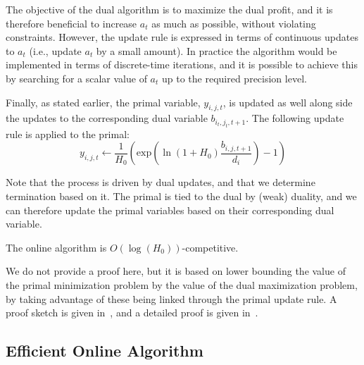 The objective of the dual algorithm is to maximize the dual profit, and it is therefore beneficial to increase $a_t$ as much as possible, without violating constraints.
However, the update rule is expressed in terms of continuous updates to $a_t$ (i.e., update $a_t$ by a small amount).
In practice the algorithm would be implemented in terms of discrete-time iterations, and it is possible to achieve this by searching for a scalar value of $a_t$ up to the required precision level.

Finally, as stated earlier, the primal variable, $y_{i,j,t}$, is updated as well along side the updates to the corresponding dual variable $b_{i_t,j_t,t+1}$.
The following update rule is applied to the primal:
\[
 y_{i,j,t} \leftarrow \frac{1}{H_0}\left(\textrm{exp}\left(\ln(1+H_0) \frac{b_{i,j,t+1}}{d_i}\right)-1\right)
\]

Note that the process is driven by dual updates, and that we determine termination based on it.
The primal is tied to the dual by (weak) duality, and we can therefore update the primal variables based on their corresponding dual variable.

\begin{theorem}
 The online algorithm is $O(\log(H_0))$-competitive.
\end{theorem}

We do not provide a proof here, but it is based on lower bounding the value of the primal minimization problem by the value of the dual maximization problem, by taking advantage of these being linked through the primal update rule.
A proof sketch is given in~\cite{buchbinder11:job-migration-techreport}, and a detailed proof is given in~\cite{buchbinder11:job-migration}.

\subsection{Efficient Online Algorithm}


